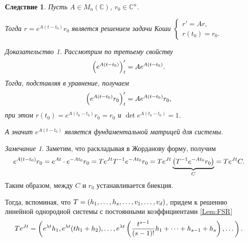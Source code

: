 \documentclass[a5paper, 10pt]{article}
\theoremstyle{definition}
\theoremstyle{plain}
\newtheorem{Cor}{Следствие}
\theoremstyle{remark}
\newtheorem*{Note}{Замечание}
\newtheorem*{Proof}{Доказательство}
\begin{document}
		\begin{Cor}
			Пусть $A \in M_n (\mathbb{C})$, $r_0 \in \mathbb{C}^n$. 
			
			Тогда $r= e^{A(t-t_0)} r_0$ является решением задачи Коши $\begin{cases}r'=Ar,\\ r(t_0) = r_0.\end{cases}$
			
			\begin{Proof}
				Рассмотрим по третьему свойству
				\[
				\left(e^{A(t-t_0)}\right)_t' = A e^{A(t-t_0)}.
				\]
				Тогда, подставляя в уравнение, получаем
				\[
				\left(e^{A(t-t_0)}r_0\right)_t' = A e^{A(t-t_0)}r_0,
				\]
				при этом $r(t_0) = e^{A(t_0-t_0)} r_0 = r_0$ и $\det e^{A(t_0-t_0)} = 1$.
				
				А значит $e^{A(t-t_0)}$ является фундаментальной матрицей для системы.
			\end{Proof}
		\end{Cor}
	
		\begin{Note}
			Заметим, что раскладывая в Жорданову форму, получим
			\[
			e^{A(t-t_0)}r_0 = e^{At}\cdot e^{-At_0}r_0 = T e^{Jt} T^{-1} e^{-At_0}r_0 = T e^{Jt} \underbrace{\left(T^{-1} e^{-At_0}r_0\right)}_{C} = Te^{Jt} C.
			\]
			Таким образом, между $C$ и $r_0$ устанавливается биекция.
			
			Тогда, вспоминая, что $T = \left(h_1, \dots, h_s, \dots, v_1, \dots, v_d\right)$, придем к решению линейной однородной системы с постоянными коэффициентами \ref{Lem:FSR}
			\[
			Te^{Jt} = \left(e^{\lambda t}h_1, e^{\lambda t} (th_1+h_2), \dots, e^{\lambda t} \left(\frac{t^{s-1}}{(s-1)!} h_1 + \dots + h_{s-1} + h_s\right), \dots\right).
			\]
		\end{Note}
\end{document}
